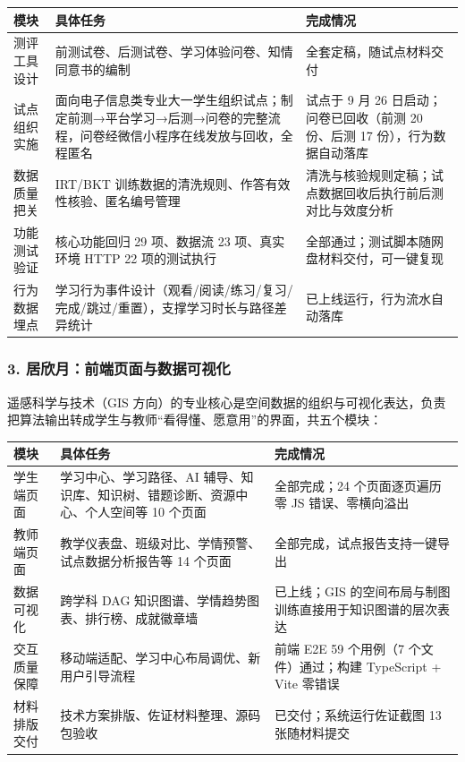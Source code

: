 \documentclass[zihao=-4,a4paper,UTF8,fontset=windows]{ctexart}
\begin{document}
\par\noindent\begin{tabular}{|p{3.0cm}|p{4.5cm}|p{6.2cm}|}
\hline
\textbf{模块} & \textbf{具体任务} & \textbf{完成情况} \\ \hline
测评工具设计 & 前测试卷、后测试卷、学习体验问卷、知情同意书的编制 & 全套定稿，随试点材料交付 \\ \hline
试点组织实施 & 面向电子信息类专业大一学生组织试点；制定前测→平台学习→后测→问卷的完整流程，问卷经微信小程序在线发放与回收，全程匿名 & 试点于 9 月 26 日启动；问卷已回收（前测 20 份、后测 17 份），行为数据自动落库 \\ \hline
数据质量把关 & IRT/BKT 训练数据的清洗规则、作答有效性核验、匿名编号管理 & 清洗与核验规则定稿；试点数据回收后执行前后测对比与效度分析 \\ \hline
功能测试验证 & 核心功能回归 29 项、数据流 23 项、真实环境 HTTP 22 项的测试执行 & 全部通过；测试脚本随网盘材料交付，可一键复现 \\ \hline
行为数据埋点 & 学习行为事件设计（观看/阅读/练习/复习/完成/跳过/重置），支撑学习时长与路径差异统计 & 已上线运行，行为流水自动落库 \\ \hline
\end{tabular}\par
\subsubsection{3. 居欣月：前端页面与数据可视化}


遥感科学与技术（GIS 方向）的专业核心是空间数据的组织与可视化表达，负责把算法输出转成学生与教师“看得懂、愿意用”的界面，共五个模块：

\par\noindent\begin{tabular}{|p{3.0cm}|p{4.5cm}|p{6.2cm}|}
\hline
\textbf{模块} & \textbf{具体任务} & \textbf{完成情况} \\ \hline
学生端页面 & 学习中心、学习路径、AI 辅导、知识库、知识树、错题诊断、资源中心、个人空间等 10 个页面 & 全部完成；24 个页面逐页遍历零 JS 错误、零横向溢出 \\ \hline
教师端页面 & 教学仪表盘、班级对比、学情预警、试点数据分析报告等 14 个页面 & 全部完成，试点报告支持一键导出 \\ \hline
数据可视化 & 跨学科 DAG 知识图谱、学情趋势图表、排行榜、成就徽章墙 & 已上线；GIS 的空间布局与制图训练直接用于知识图谱的层次表达 \\ \hline
交互质量保障 & 移动端适配、学习中心布局调优、新用户引导流程 & 前端 E2E 59 个用例（7 个文件）通过；构建 TypeScript + Vite 零错误 \\ \hline
材料排版交付 & 技术方案排版、佐证材料整理、源码包验收 & 已交付；系统运行佐证截图 13 张随材料提交 \\ \hline
\end{tabular}\par
\end{document}

